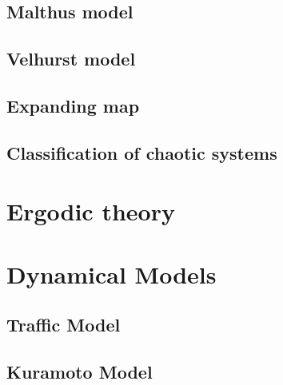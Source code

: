\documentclass[12pt]{book}
\begin{document}
\section{Malthus model}

\section{Velhurst model}

\section{Expanding map}

\section{Classification of chaotic systems}

\chapter{Ergodic theory}

\chapter{Dynamical Models}
\section{Traffic Model}

\section{Kuramoto Model}

\end{document}

